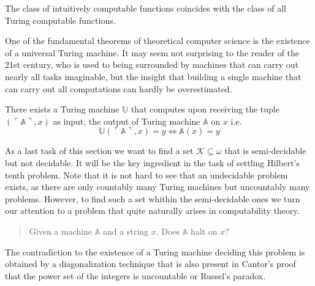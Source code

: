 \begin{churchturing}
  The class of intuitively computable
  functions coincides with the class of all Turing computable functions.
\end{churchturing}

One of the fundamental theorems of theoretical computer science is the existence
of a universal Turing machine. It may seem not surprising to the reader of the
21\textup{st} century, who is used to being surrounded by machines that can
carry out nearly all tasks imaginable, but the insight that building a single
machine that can carry out all computations can hardly be overestimated.

\begin{thm}
    There exists a Turing machine $\mathbb U$ that computes upon receiving
    the tuple $(\ulcorner \mathbb A \urcorner, x)$ as input, the output of
    Turing machine $\mathbb A$ on $x$ i.e.
    \[
      \mathbb U(\ulcorner \mathbb A \urcorner, x) = y \Leftrightarrow
        \mathbb A (x) = y
    \]
\end{thm}

As a last task of this section we want to find a set \(\mathcal{K} \subseteq ω\)
that is semi-decidable but not decidable. It will be the key ingredient in the
task of settling Hilbert's tenth problem. Note that it is not hard to see that
an undecidable problem exists, as there are only countably many Turing machines
but uncountably many problems. However, to find such a set whithin the
semi-decidable ones we turn our attention to a problem that quite naturally
arises in computability theory.
\begin{quote}
  Given a machine $\mathbb A$ and a string $x$. Does $\mathbb A$
  halt on $x$?
\end{quote}
The contradiction to the existence of a Turing machine deciding this problem is
obtained by a diagonalization technique that is also present in Cantor's proof
that the power set of the integers is uncountable or Russel's paradox.

